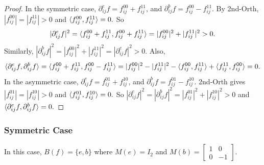 \begin{proof}
    In the symmetric case, $\partial_{ij}^ef=f_{ij}^{00}+f_{ij}^{11}$, and $\partial_{ij}^bf=f_{ij}^{00}-f_{ij}^{11}$.
    By {\sc 2nd-Orth}, $|f_{ij}^{00}|=|f_{ij}^{11}|>0$ and $\braket{f_{ij}^{00},f_{ij}^{11}}=0.$
    So
    \begin{equation*}
        \begin{aligned}
            |\partial_{ij}^{e}f|^2=\braket{f_{ij}^{00}+f_{ij}^{11},f_{ij}^{00}+f_{ij}^{11}}=|f_{ij}^{00}|^2+|f_{ij}^{11}|^2>0.
        \end{aligned}
    \end{equation*}
    Similarly, $|\partial_{ij}^{b}f|^2=|f_{ij}^{00}|^2+|f_{ij}^{11}|^2=|\partial_{ij}^{e}f|^2>0.$
    Also,
    \begin{equation*}
        \begin{aligned}
            \braket{\partial_{ij}^{e}f,\partial_{ij}^{b}f}=\braket{f_{ij}^{00}+f_{ij}^{11},f_{ij}^{00}-f_{ij}^{11}}=|f_{ij}^{00}|^2-|f_{ij}^{11}|^2-\braket{f_{ij}^{00},f_{ij}^{11}}+\braket{f_{ij}^{11},f_{ij}^{00}}
            =0.
        \end{aligned}
    \end{equation*}
    In the asymmetric case, $\partial_{ij}^ef=f_{ij}^{01}+f_{ij}^{10}$, and $\partial_{ij}^bf=f_{ij}^{01}-f_{ij}^{10}$.
    {\sc 2nd-Orth} gives $|f_{ij}^{01}|=|f_{ij}^{10}|>0$ and $\braket{f_{ij}^{01},f_{ij}^{10}}=0.$
    So $|\partial_{ij}^{e}f|^2=|\partial_{ij}^bf|^2=|f_{ij}^{01}|^2+|f_{ij}^{10}|^2> 0$ and $\braket{\partial_{ij}^ef,\partial_{ij}^bf}=0.$
\end{proof}

\subsubsection{Symmetric Case}

In this case, $B(f)=\{e,b\}$ where $M(e)=I_2$ and $M(b)=\left[\begin{matrix}
    1 & 0\\
    0 & -1
\end{matrix}\right]$.

